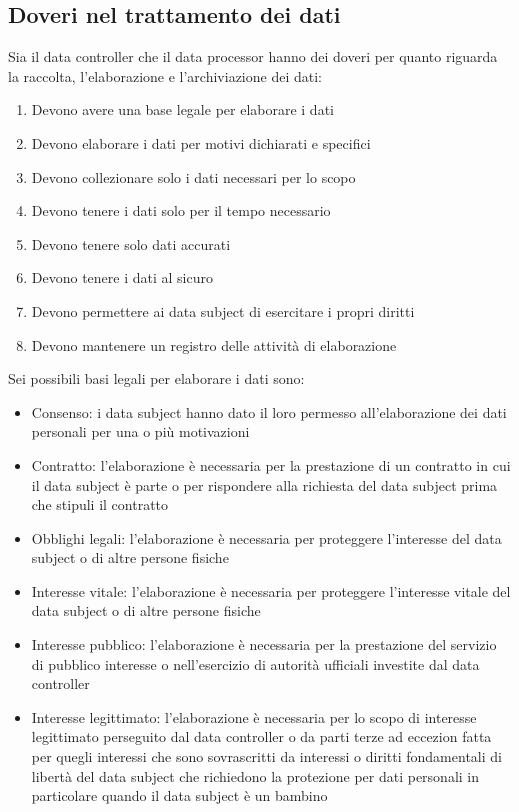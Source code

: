 \subsection{Doveri nel trattamento dei dati}
Sia il data controller che il data processor hanno dei doveri per quanto riguarda la raccolta, l'elaborazione e l'archiviazione dei dati:
\begin{enumerate}[noitemsep]
    \item Devono avere una base legale per elaborare i dati
    \item Devono elaborare i dati per motivi dichiarati e specifici
    \item Devono collezionare solo i dati necessari per lo scopo
    \item Devono tenere i dati solo per il tempo necessario
    \item Devono tenere solo dati accurati
    \item Devono tenere i dati al sicuro
    \item Devono permettere ai data subject di esercitare i propri diritti
    \item Devono mantenere un registro delle attività di elaborazione
\end{enumerate}
Sei possibili basi legali per elaborare i dati sono:
\begin{itemize}[noitemsep]
    \item Consenso: i data subject hanno dato il loro permesso all'elaborazione dei dati personali per una o più motivazioni
    \item Contratto: l'elaborazione è necessaria per la prestazione di un contratto in cui il data subject è parte o per rispondere alla richiesta del data subject prima che stipuli il contratto
    \item Obblighi legali: l'elaborazione è necessaria per proteggere l'interesse del data subject o di altre persone fisiche
    \item Interesse vitale: l'elaborazione è necessaria per proteggere l'interesse vitale del data subject o di altre persone fisiche
    \item Interesse pubblico: l'elaborazione è necessaria per la prestazione del servizio di pubblico interesse o nell'esercizio di autorità ufficiali investite dal data controller
    \item Interesse legittimato: l'elaborazione è necessaria per lo scopo di interesse legittimato perseguito dal data controller o da parti terze ad eccezion fatta per quegli interessi che sono sovrascritti da interessi o diritti fondamentali di libertà del data subject che richiedono la protezione per dati personali in particolare quando il data subject è un bambino
\end{itemize}
